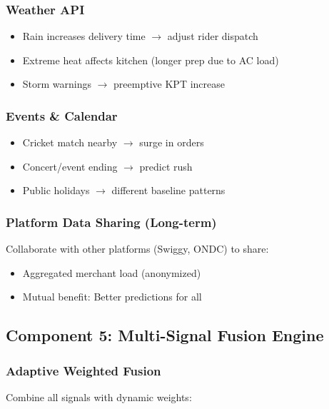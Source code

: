 \documentclass[11pt,a4paper]{article}
\begin{document}
\subsubsection{Weather API}

\begin{itemize}[leftmargin=*]
    \item Rain increases delivery time $\rightarrow$ adjust rider dispatch
    \item Extreme heat affects kitchen (longer prep due to AC load)
    \item Storm warnings $\rightarrow$ preemptive KPT increase
\end{itemize}

\subsubsection{Events \& Calendar}

\begin{itemize}[leftmargin=*]
    \item Cricket match nearby $\rightarrow$ surge in orders
    \item Concert/event ending $\rightarrow$ predict rush
    \item Public holidays $\rightarrow$ different baseline patterns
\end{itemize}

\subsubsection{Platform Data Sharing (Long-term)}

Collaborate with other platforms (Swiggy, ONDC) to share:
\begin{itemize}
    \item Aggregated merchant load (anonymized)
    \item Mutual benefit: Better predictions for all
\end{itemize}

\subsection{Component 5: Multi-Signal Fusion Engine}

\subsubsection{Adaptive Weighted Fusion}

Combine all signals with dynamic weights:
\end{document}
